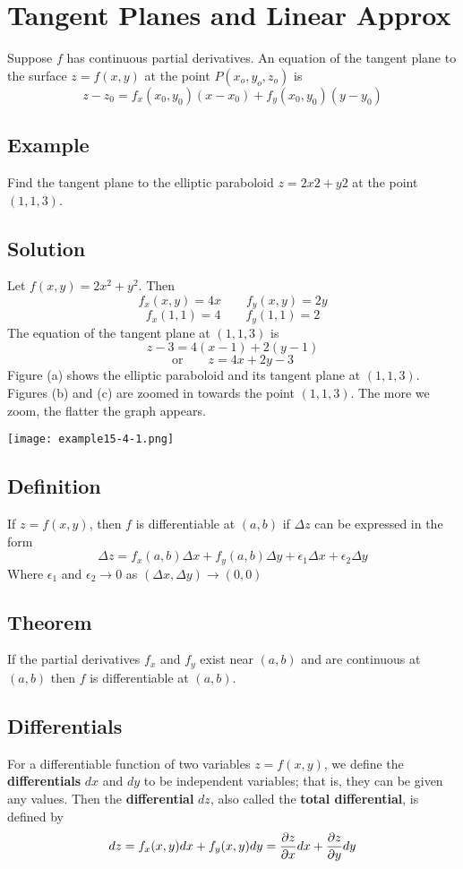 \section{Tangent Planes and Linear Approx}
Suppose $f$ has continuous partial derivatives. An equation of the tangent plane
to the surface $z = f(x, y)$ at the point $P(x_o, y_o, z_o)$ is
$$z-z_0=f_x(x_0,y_0)(x-x_0)+f_y(x_0,y_0)(y-y_0)$$

\subsection*{Example}
Find the tangent plane to the elliptic paraboloid $z=2x2+y2$ at the point $(1, 1, 3)$.

\subsection*{Solution}
Let $f(x, y) =  2x^2 + y^2$. Then
$$f_x(x, y) = 4x \qquad f_y(x, y) = 2y$$
$$f_x(1, 1) = 4 \qquad f_y(1, 1) = 2$$
The equation of the tangent plane at $(1, 1, 3)$ is
$$z - 3 = 4(x - 1) + 2(y - 1)$$
$$\text{or} \qquad z = 4x + 2y - 3$$
Figure (a) shows the elliptic paraboloid and its tangent plane at $(1,1,3)$. Figures
(b) and (c) are zoomed in towards the point $(1,1,3)$. The more we zoom, the flatter the graph appears.
\begin{center}
    \texttt{[image: example15-4-1.png]}
\end{center}

\subsection*{Definition}
If $z=f(x,y)$, then $f$ is differentiable at $(a,b)$ if $\Delta z$ can be expressed
in the form
$$\Delta z=f_x(a,b)\Delta x+f_y(a,b)\Delta y+\epsilon_1\Delta x+\epsilon_2\Delta y$$
Where $\epsilon_1$ and $\epsilon_2 \to 0$ as $(\Delta x, \Delta y)\to(0,0)$

\subsection*{Theorem}
If the partial derivatives $f_x$ and $f_y$ exist near $(a, b)$ and are continuous at
$(a, b)$ then $f$ is differentiable at $(a, b)$.

\subsection*{Differentials}
For a differentiable function of two variables $z = f(x, y)$, we define the
\textbf{differentials} $dx$ and $dy$ to be independent variables; that is, they can be
given any values. Then the \textbf{differential} $dz$, also called
the \textbf{total differential}, is defined by
$$dz = f_x(x, y) dx + f_y(x, y) dy = \pdv{z}{x}dx + \pdv{z}{y}dy$$


